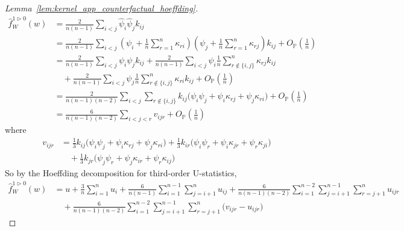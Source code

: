 \documentclass[11pt,lof]{puthesis}
\renewcommand{\P}{\ensuremath{\mathbb{P}}}
\theoremstyle{break}
\theoremstyle{proof}
\newtheorem{proof}{Proof}
\begin{document}
\begin{proof}[Lemma~\ref{lem:kernel_app_counterfactual_hoeffding}]
  \begin{align*}
    \hat f_W^{1 \triangleright 0}(w)
    &=
    \frac{2}{n(n-1)}
    \sum_{i < j}
    \hat \psi_i
    \hat \psi_j
    k_{i j} \\
    &=
    \frac{2}{n(n-1)}
    \sum_{i < j}
    \left(
      \psi_i
      + \frac{1}{n}
      \sum_{r=1}^n \kappa_{r i}
    \right)
    \left(
      \psi_j
      + \frac{1}{n}
      \sum_{r=1}^n \kappa_{r j}
    \right)
    k_{i j}
    + O_\P\left(\frac{1}{n}\right) \\
    &=
    \frac{2}{n(n-1)}
    \sum_{i < j}
    \psi_i
    \psi_j
    k_{i j}
    + \frac{2}{n(n-1)}
    \sum_{i < j}
    \psi_i
    \frac{1}{n}
    \sum_{r \notin \{i,j\}}^n \kappa_{r j}
    k_{i j} \\
    &\quad+
    \frac{2}{n(n-1)}
    \sum_{i < j}
    \psi_j
    \frac{1}{n}
    \sum_{r \notin \{i,j\}}^n \kappa_{r i}
    k_{i j}
    + O_\P\left(\frac{1}{n}\right) \\
    &=
    \frac{2}{n(n-1)(n-2)}
    \sum_{i < j}
    \sum_{r \notin \{i,j\}}
    k_{i j}
    \Big(
      \psi_i
      \psi_j
      +\psi_i
      \kappa_{r j}
      +\psi_j
      \kappa_{r i}
    \Big)
    + O_\P\left(\frac{1}{n}\right) \\
    &=
    \frac{6}{n(n-1)(n-2)}
    \sum_{i < j < r}
    v_{i j r}
    + O_\P\left(\frac{1}{n}\right)
  \end{align*}
  where
  \begin{align*}
    v_{i j r}
    &=
    \frac{1}{3}
    k_{i j} \Big(\psi_i \psi_j +\psi_i \kappa_{r j} +\psi_j \kappa_{r i} \Big)
    + \frac{1}{3}
    k_{i r} \Big(\psi_i \psi_r +\psi_i \kappa_{jr} +\psi_r \kappa_{j i} \Big) \\
    &\quad+
    \frac{1}{3}
    k_{jr} \Big(\psi_j \psi_r +\psi_j \kappa_{i r} +\psi_r \kappa_{i j} \Big)
  \end{align*}
  So by the Hoeffding decomposition for third-order U-statistics,
  \begin{align*}
    \hat f_W^{1 \triangleright 0}(w)
    &=
    u
    + \frac{3}{n}
    \sum_{i=1}^n
    u_i
    + \frac{6}{n(n-1)}
    \sum_{i=1}^{n-1}
    \sum_{j=i+1}^n
    u_{i j}
    + \frac{6}{n(n-1)(n-2)}
    \sum_{i=1}^{n-2}
    \sum_{j=i+1}^{n-1}
    \sum_{r=j+1}^n
    u_{i j r} \\
    &\quad+
    \frac{6}{n(n-1)(n-2)}
    \sum_{i=1}^{n-2}
    \sum_{j=i+1}^{n-1}
    \sum_{r=j+1}^n
    \big(v_{i j r} - u_{i j r}\big)

\end{align*}
\end{proof}
\end{document}
